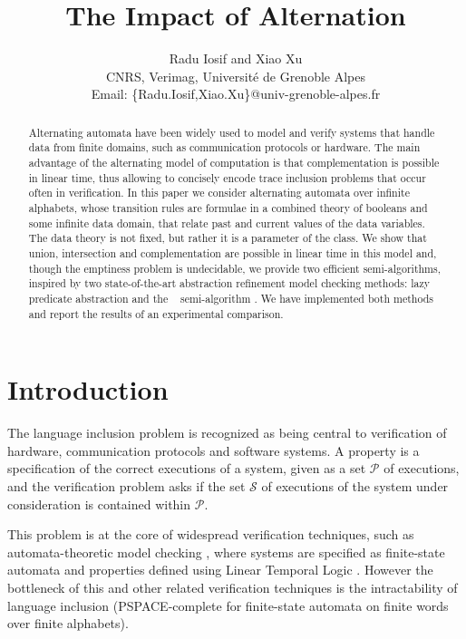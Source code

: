 \documentclass[10pt,conference,letterpaper,twocolumn]{IEEEtran}
\begin{document}

\title{The Impact of Alternation}

\author{Radu Iosif and Xiao Xu \\
CNRS, Verimag, Universit\'e de Grenoble Alpes \\
Email: \{Radu.Iosif,Xiao.Xu\}@univ-grenoble-alpes.fr}

\maketitle

\begin{abstract}
Alternating automata have been widely used to model and verify systems
that handle data from finite domains, such as communication protocols
or hardware. The main advantage of the alternating model of
computation is that complementation is possible in linear time, thus
allowing to concisely encode trace inclusion problems that occur often
in verification. In this paper we consider alternating automata over
infinite alphabets, whose transition rules are formulae in a combined
theory of booleans and some infinite data domain, that relate past and
current values of the data variables. The data theory is not fixed,
but rather it is a parameter of the class. We show that union,
intersection and complementation are possible in linear time in this
model and, though the emptiness problem is undecidable, we provide two
efficient semi-algorithms, inspired by two state-of-the-art
abstraction refinement model checking methods: lazy predicate
abstraction \cite{HJMS02} and the \impact~ semi-algorithm
\cite{mcmillan06}. We have implemented both methods and report the
results of an experimental comparison.
\end{abstract}

\section{Introduction}

The language inclusion problem is recognized as being central to
verification of hardware, communication protocols and software
systems. A property is a specification of the correct executions of a
system, given as a set $\mathcal{P}$ of executions, and the
verification problem asks if the set $\mathcal{S}$ of executions of
the system under consideration is contained within $\mathcal{P}$.

This problem is at the core of widespread verification techniques,
such as automata-theoretic model checking \cite{VARDI94}, where
systems are specified as finite-state automata and properties defined
using Linear Temporal Logic \cite{Pnueli77}. However the bottleneck of
this and other related verification techniques is the intractability
of language inclusion (PSPACE-complete for finite-state automata on
finite words over finite alphabets).
\end{document}
